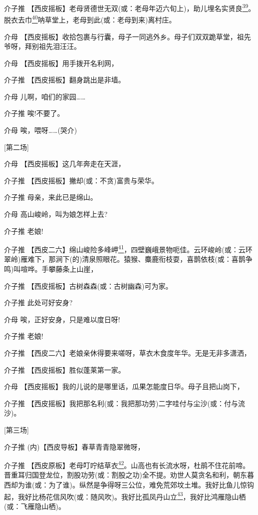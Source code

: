 介子推
【西皮摇板】老母贤德世无双(或：老母年迈六旬上)，助儿埋名实贤良\protect\hyperlink{fn39}{\textsuperscript{39}}。脱衣去巾\protect\hyperlink{fn40}{\textsuperscript{40}}呐草堂上，老母到此(或：老母到来)离村庄。

介母
【西皮摇板】收拾包裹与行囊，母子一同逃外乡。母子们双双跪草堂，祖先爷呀，拜别祖先泪汪汪。

介母 【西皮摇板】用手拨开名利网，

介子推 【西皮摇板】翻身跳出是非墙。

介母 儿啊，咱们的家园\ldots{}\ldots{}

介子推 唉!不要了。

介母 唉，喂呀\ldots{}\ldots{}(哭介)

{[}第二场{]}

介母 【西皮摇板】这几年奔走在天涯，

介子推 【西皮摇板】撇却(或：不贪)富贵与荣华。

介子推 母亲，来此已是绵山。

介母 高山峻岭，叫为娘怎样上去?

介子推 老娘!

介子推
【西皮二六】绵山峻险多峰岬\protect\hyperlink{fn41}{\textsuperscript{41}}，四壁巍峨景物呃佳。云环峻岭(或：云环翠岭)雁难下，那涧下(的)清泉照眼花。猿猴、麋鹿衔枝耍，喜鹊依枝(或：喜鹊争鸣)叫喧哗。手攀藤条上山崖，

介子推 【西皮摇板】古树森森(或：古树幽森)可为家。

介子推 此处可好安身?

介母 唉，正好安身，只是难以度日呀!

介子推 老娘!

介子推 【西皮二六】老娘亲休得要来嗟呀，草衣木食度年华。无是无非多潇洒，

介子推 【西皮摇板】胜似蓬莱第一家。

介母 【西皮摇板】我的儿说的是哪里话，瓜果怎能度日华。母子且把山岗下，

介子推
【西皮摇板】我把那名利(或：我把那功劳)二字哇付与尘沙(或：付与流沙)。

{[}第三场{]}

介子推 (内)【西皮导板】春草青青隐翠微呀，

介子推
【西皮原板】老母叮咛结草衣\protect\hyperlink{fn42}{\textsuperscript{42}}。山高也有长流水呀，杜鹃不住花前啼。晋重耳归国登龙位，割股功劳(或：割股之功)全不提。劝世人莫贪名和利，朝东暮西却为谁(或：为了谁)。纵然是争得呀三公位，难免荒郊坟土堆。我好比鱼儿惊钩起，我好比杨花信风吹(或：随风吹)。我好比孤凤丹山立\protect\hyperlink{fn43}{\textsuperscript{43}}，我好比鸿雁隐山栖(或：飞雁隐山栖)。

